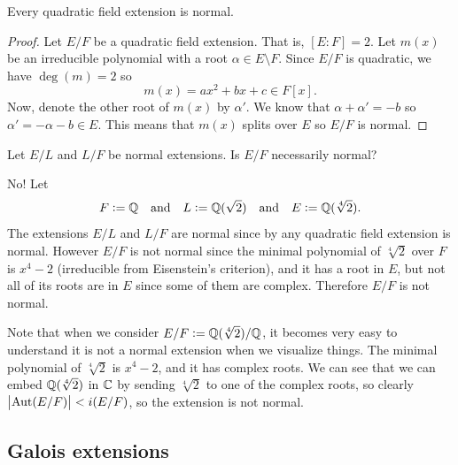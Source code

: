 \documentclass[11pt,a4paper]{article}
\begin{document}
\begin{lemma}
  \label{lem:quadratic-implies-normal}
  Every quadratic field extension is normal.
\end{lemma}
\begin{proof}
  Let $E/F$ be a quadratic field extension.
  That is, $[E : F] = 2$.
  Let $m(x)$ be an irreducible polynomial with a root
  $\alpha \in E \setminus F$.
  Since $E/F$ is quadratic, we have $\deg(m) = 2$ so
  \[
    m(x) = ax^2 + bx + c \in F[x].
  \]
  Now, denote the other root of $m(x)$ by $\alpha'$.
  We know that $\alpha + \alpha' = -b$
  so $\alpha' = -\alpha - b \in E$.
  This means that $m(x)$ splits over $E$ so $E/F$ is normal.
\end{proof}

\begin{question}
  Let $E/L$ and $L/F$ be normal extensions.
  Is $E/F$ necessarily normal?
\end{question}
\begin{answer}
  No!
  Let
  \[
    F := \mathbb{Q} \quad \text{and} \quad
    L := \mathbb{Q}(\sqrt{2}) \quad \text{and} \quad
    E := \mathbb{Q}(\sqrt[4]{2}).
  \]
  The extensions $E/L$ and $L/F$ are normal
  since by 
  any quadratic field extension is normal.
  However $E/F$ is not normal since the minimal polynomial of $\sqrt[4]{2}$
  over $F$ is $x^4 - 2$ (irreducible from Eisenstein's criterion),
  and it has a root in $E$, but not all of its roots are in $E$
  since some of them are complex.
  Therefore $E/F$ is not normal.
\end{answer}

\begin{remark}
  Note that when we consider $E/F := \mathbb{Q}(\sqrt[4]{2})/\mathbb{Q}$,
  it becomes very easy to understand it is not a normal extension
  when we visualize things.
  The minimal polynomial of $\sqrt[4]{2}$ is $x^4 - 2$,
  and it has complex roots.
  We can see that we can embed $\mathbb{Q}(\sqrt[4]{2})$ in $\mathbb{C}$
  by sending $\sqrt[4]{2}$ to one of the complex roots,
  so clearly $\left\lvert\operatorname{Aut}(E/F)\right\rvert < i(E/F)$,
  so the extension is not normal.
\end{remark}

\subsection{Galois extensions}
\end{document}
